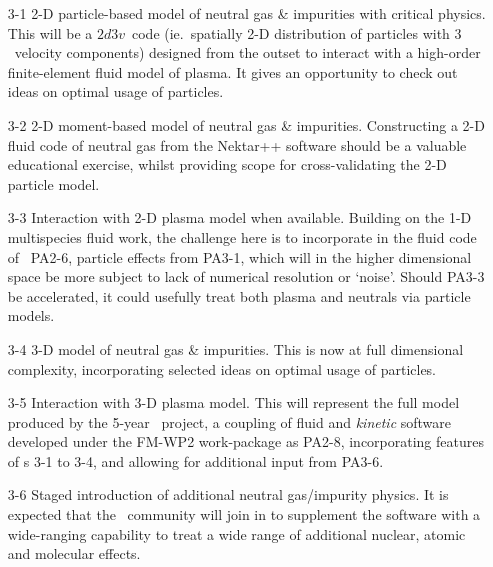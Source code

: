 \begin{itemize}
\item[3-1] 2-D particle-based model of neutral gas \& impurities with critical physics.
This will be a $2d3v$~code (ie.\ spatially 2-D distribution of particles
with $3$~velocity components)
designed from the outset to interact with a high-order finite-element fluid model of plasma.
It gives an opportunity to check out ideas on optimal usage of particles.
\item[3-2] 2-D moment-based model of neutral gas \& impurities.
Constructing a 2-D fluid code of neutral gas from the Nektar++ software should be
a valuable educational exercise, whilst providing scope for cross-validating the 2-D particle model.
\item[3-3] Interaction with 2-D plasma model when available.
Building on the 1-D multispecies fluid work, the challenge here is to incorporate
in the fluid code of \Papp \ PA2-6, particle effects from PA3-1, which will in
the higher dimensional space be more subject to lack of numerical
resolution or `noise'. Should PA3-3 be accelerated, it could usefully 
treat both plasma and neutrals via particle models.
\item[3-4] 3-D model of neutral gas \& impurities.
This is now at full dimensional complexity, incorporating selected ideas 
on optimal usage of particles.
\item[3-5] Interaction with 3-D plasma model.
This will represent the full model produced by the 5-year \nep \ project,
a coupling of fluid and \emph{kinetic} software developed under the FM-WP2 work-package as PA2-8,
incorporating features of \Papp s 3-1 to 3-4, and allowing for additional input from PA3-6.
\item[3-6] Staged introduction of additional neutral gas/impurity physics.
It is expected that the \nep \ community will join in to supplement
the software with a wide-ranging capability to treat a wide range of additional 
nuclear, atomic and molecular effects.
\end{itemize}



